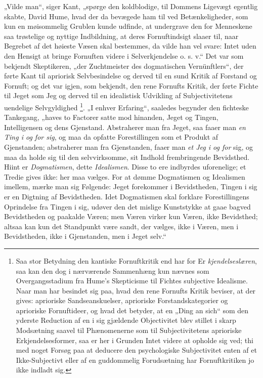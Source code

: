 \documentclass[11pt]{book}
\newcommand{\opage}[1]{\marginnote{\footnotesize\textit{[#1]}}}
\begin{document}
„Vilde man“, siger Kant, „spørge den koldblodige, til Dommens
Ligevægt egentlig skabte, David Hume, hvad der da bevægede ham til ved
Betænkeligheder, som kun en møisommelig Grublen kunde udfinde, at
undergrave den for Menneskene saa trøstelige og nyttige Indbildning,
at deres Fornuftindsigt slaaer til, naar Begrebet af det høieste Væsen
skal bestemmes, da vilde han vel svare: Intet uden den Hensigt at
bringe Fornuften videre i Selverkjendelse o. s. v.“ Det var som
bekjendt Skeptikeren, „der Zuchtmeister des dogmatischen
Vernünftlers“, der førte Kant til apriorisk Selvbesindelse og derved
til en sund Kritik af Forstand og Fornuft; og det var igjen, som
bekjendt, den rene Fornufts Kritik, der førte Fichte til Jeget som Jeg
og derved til en idealistisk Udvikling af Subjectivitetens uendelige
Selvgyldighed%
\footnote{Saa stor Betydning den kantiske Fornuftkritik end har for
Er\-%
\emph{kjendelseslæren}, saa kan den dog i nærværende Sammenhæng kun
nævnes som Overgangsstadium fra Hume's Skepticisme til Fichtes
subjective Idealisme. Naar man har besindet sig paa, hvad den rene
Fornufts Kritik beviser, at der gives: aprioriske Sandseanskuelser,
aprioriske Forstandskategorier og aprioriske Fornuftideer, og hvad det
betyder, at en „Ding an sich“ som den yderste Reduction af en i sig
gjældende Objectivitet blev stillet i skarp Modsætning saavel til
Phænomenerne som til Subjectivitetens aprioriske Erkjendelsesformer,
saa er her i Grunden Intet videre at opholde sig ved; thi med noget
Forsøg paa at deducere den psychologiske Subjectivitet enten af et
Ikke-Subjectivt eller af en guddommelig Forudsætning har
Fornuftkritiken jo ikke indladt sig.}.
\opage{31} \setcounter{footnote}{0}%
„I enhver Erfaring“, saaledes begynder den fichteske Tankegang, „haves
to Factorer satte mod hinanden, Jeget og Tingen, Intelligensen og dens
Gjenstand. Abstraherer man fra Jeget, saa faaer man \emph{en Ting i og
for sig}, og maa da opfatte Forestillingen som et Produkt af
Gjenstanden; abstraherer man fra Gjenstanden, faaer man \emph{et Jeg i
og for} sig, og maa da holde sig til den selvvirksomme, sit Indhold
frembringende Bevidsthed. Hiint er \emph{Dogmatismen}, dette
\emph{Idealismen}. Disse to ere indbyrdes uforenelige; et Tredie gives
ikke: her maa vælges. For at dømme Dogmatismen og Idealismen imellem,
mærke man sig Følgende: Jeget forekommer i Bevidstheden, Tingen i sig
er en Digtning af Bevidstheden. Idet Dogmatismen skal forklare
Forestillingens Oprindelse fra Tingen i sig, udøver den det mislige
Kunststykke at gaae bagved Bevidstheden og paakalde Væren; men Væren
virker kun Væren, ikke Bevidsthed; altsaa kan kun det Standpunkt være
sandt, der vælges, ikke i Væren, men i Bevidstheden, ikke i
Gjenstanden, men i Jeget selv.“
\end{document}
